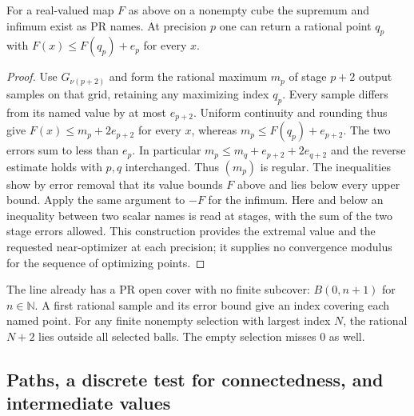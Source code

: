 \begin{corollary}\label{idx-metric247}
For a real-valued map $F$ as above on a nonempty cube the supremum and
infimum exist as PR names. At precision $p$ one can return a rational point
$q_p$ with $F(x)\le F(q_p)+e_p$ for every $x$.
\end{corollary}
\begin{proof}
Use $G_{\nu(p+2)}$ and form the rational maximum $m_p$ of stage $p+2$
output samples on that grid, retaining any maximizing index $q_p$.
Every sample differs from its named value by at most $e_{p+2}$.
Uniform continuity and rounding thus give
$F(x)\le m_p+2e_{p+2}$ for every $x$, whereas
$m_p\le F(q_p)+e_{p+2}$. The two errors sum to less than $e_p$.
In particular $m_p\le m_q+e_{p+2}+2e_{q+2}$ and the reverse estimate
holds with $p,q$ interchanged. Thus $(m_p)$ is regular. The inequalities
show by error removal that its value bounds $F$ above and lies below every
upper bound. Apply the same argument to $-F$ for the infimum.
Here and below an inequality between two scalar names is read at stages,
with the sum of the two stage errors allowed. This construction provides
the extremal value and the requested near-optimizer at each precision;
it supplies no convergence modulus for the sequence of optimizing points.
\end{proof}

The line already has a PR open cover with no finite subcover:
$B(0,n+1)$ for $n\in\mathbb N$. A first rational sample and its error
bound give an index covering each named point. For any finite nonempty
selection with largest index $N$, the rational $N+2$ lies outside all
selected balls. The empty selection misses $0$ as well.

\subsection{Paths, a discrete test for connectedness, and intermediate values}

